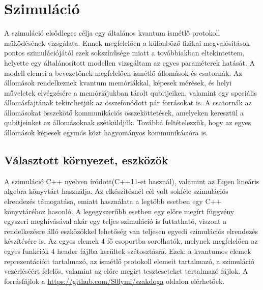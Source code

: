 \chapter{Szimuláció}

A szimuláció elsődleges célja egy általános kvantum ismétlő protokoll működésének vizsgálata. Ennek megfelelően a különböző fizikai megvalósítások pontos szimulációjától ezek sokszínűsége miatt a továbbiakban eltekintettem, helyette egy általánosított modellen vizsgáltam az egyes paraméterek hatását. A modell elemei a bevezetőnek megfelelően ismétlő állomások és csatornák. Az állomások rendelkeznek kvantum memóriákkal, képesek mérések, és helyi műveletek elvégzésére a memóriájukban tárolt qubitjeiken, valamint egy speciális állomásfajtának tekinthetjük az összefonódott pár forrásokat is. A csatornák az állomásokat összekötő kommunikációs összeköttetések, amelyeken keresztül a qubitjeinket az állomásoknak szétküldjük. Továbbá feltételezzük, hogy az egyes állomások képesek egymás közt hagyományos kommunikációra is. 

\section{Választott környezet, eszközök}

A szimuláció C++ nyelven íródott(C++11-et használ), valamint az Eigen \cite{eigen}  lineáris algebra könyvtárt használja. Az elkészítésnél cél volt sokféle szimulációs elrendezés támogatása, emiatt használata a legtöbb esetben egy C++ könyvtáréhoz hasonló. A legegyszerűbb esetben egy előre megírt függvény egyszeri meghívásával akár egy teljes szimuláció is futtatható, viszont a rendelkezésre álló eszközökkel lehetőség van teljesen egyedi szimulációs elrendezés készítésére is. Az egyes elemek 4 fő csoportba sorolhatók, melynek megfelelően az egyes funkciók 4 header fájlba kerültek szétosztásra. Ezek: a kvantumos elemek reprezentációit tartalmazó, az ismétlő protokoll elemeit tartalmazó, a szimuláció vezérléséért felelős, valamint az előre megírt teszteseteket  tartalmazó fájlok. A forrásfájlok a \url{https://github.com/S0lymi/szakdoga} oldalon elérhetőek.


